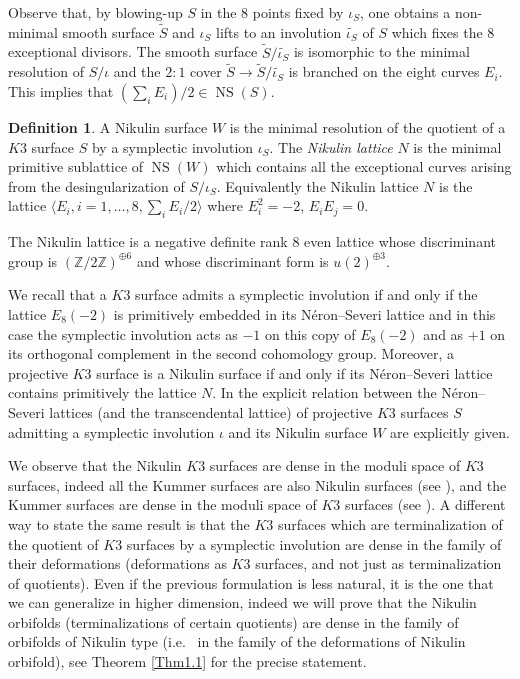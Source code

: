 \documentclass{amsart}
\theoremstyle{definition}
\newtheorem{defi}[thm]{Definition}
\numberwithin{equation}{section}
\numberwithin{equation}{section} \theoremstyle{definition}
\DeclareMathOperator{\NS}{NS}
\newcommand{\ra}{\rightarrow}
\newcommand\Z{\mathbb{Z}}
\begin{document}
Observe that, by blowing-up $S$ in the 8 points fixed by $\iota_S$, one obtains a non-minimal smooth surface $\widetilde{S}$ and $\iota_S$ lifts to an involution  $\widetilde{\iota_S}$ of $S$ which fixes the 8 exceptional divisors. The smooth surface  $\widetilde{S}/\widetilde{\iota_S}$ is isomorphic to the minimal resolution of $S/\iota$ and the $2:1$ cover $\widetilde{S}\ra \widetilde{S}/\widetilde{\iota_S}$ is branched on the eight curves $E_i$. This implies that $(\sum_iE_i)/2\in \NS(S)$.
\begin{defi}\label{def:Nikulin surface and lattice}
A Nikulin surface $W$ is the minimal resolution of the quotient of a $K3$ surface $S$ by a symplectic involution $\iota_S$.
The \emph{Nikulin lattice} $N$ is the minimal primitive sublattice of $\NS(W)$ which contains all the exceptional curves arising from the desingularization of $S/\iota_S$.
Equivalently the Nikulin lattice $N$ is the lattice $\langle E_i,i=1,\ldots, 8, \sum_iE_i/2\rangle$ where $E_i^2=-2$, $E_iE_j=0$.
\end{defi}
The Nikulin lattice is a negative definite rank $8$ even lattice whose discriminant group is $(\Z/2\Z)^{\oplus 6}$ and whose discriminant form is $u(2)^{\oplus 3}$.

We recall that a $K3$ surface admits a symplectic involution if and only if the lattice $E_8(-2)$ is primitively embedded in its N\'eron--Severi lattice and in this case the symplectic involution acts as $-1$ on this copy of $E_8(-2)$ and as $+1$ on its orthogonal complement in the second cohomology group. Moreover, a projective $K3$ surface is a Nikulin surface if and only if its N\'eron--Severi lattice contains primitively the lattice $N$. %
In \cite[Corollary 2.2]{GS} the explicit relation between the N\'eron--Severi lattices (and the transcendental lattice) of projective $K3$ surfaces $S$ admitting a symplectic involution $\iota$ and its Nikulin surface $W$ are explicitly given.

We observe that the Nikulin $K3$ surfaces are dense in the moduli space of $K3$ surfaces, indeed all the Kummer surfaces are also Nikulin surfaces (see \cite{NikKumm}), and the Kummer surfaces are dense in the moduli space of $K3$ surfaces (see \cite{PS}). A different way to state the same result is that the $K3$ surfaces which are terminalization of the quotient of $K3$ surfaces by a symplectic involution are dense in the family of their deformations (deformations as $K3$ surfaces, and not just as terminalization of quotients). Even if the previous formulation is less natural, it is the one that we can generalize in higher dimension, indeed  we will prove that the Nikulin orbifolds (terminalizations of certain quotients) are dense in the family of orbifolds of Nikulin type (i.e.~ in the family of the deformations of Nikulin orbifold), see Theorem \ref{Thm1.1} for the precise statement.
\end{document}
